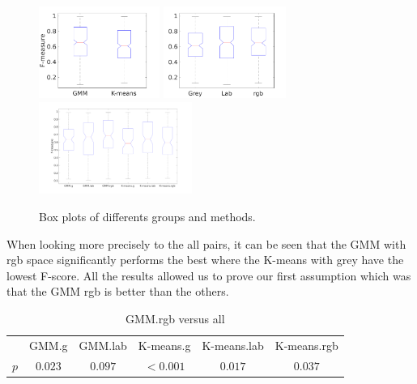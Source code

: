 \documentclass[runningheads,a4paper]{llncs}
\begin{document}
\begin{figure}
\centering
\includegraphics[height=3cm]{Figures/boxplot_method}
\includegraphics[height=3cm]{Figures/boxplot_space}
\includegraphics[height=3cm]{Figures/Fmeas_boxplot}
\caption{Box plots of differents groups and methods.}
\end{figure}

When looking more precisely to the all pairs, it can be seen that the GMM with rgb space significantly performs the best where the K-means with grey have the lowest F-score.  All the results allowed us to prove our first assumption  which was that the GMM rgb is better than the others.

\begin{table}
\centering
\caption{GMM.rgb versus all}
\label{tab:mtrebetween}
\begin{tabular}{l|ccccc}
\toprule
	&	GMM.g	&	GMM.lab	&	K-means.g 	&	K-means.lab	&	K-means.rgb\\
\cmidrule(lr){2-6}
$p$					&	$0.023$	&	$0.097$			&	$<0.001$	&	$0.017$	&	$0.037$\\
\bottomrule
\end{tabular}
\end{table}
\end{document}

